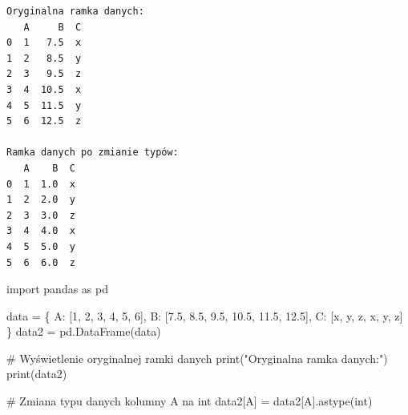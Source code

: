 \documentclass[
  polish,
  letterpaper,
  DIV=11,
  numbers=noendperiod]{scrreprt}
\newenvironment{Shaded}{\begin{snugshade}}{\end{snugshade}}
\newcommand{\BuiltInTok}[1]{\textcolor[rgb]{0.00,0.23,0.31}{#1}}
\newcommand{\CommentTok}[1]{\textcolor[rgb]{0.37,0.37,0.37}{#1}}
\newcommand{\ImportTok}[1]{\textcolor[rgb]{0.00,0.46,0.62}{#1}}
\newcommand{\NormalTok}[1]{\textcolor[rgb]{0.00,0.23,0.31}{#1}}
\newcommand{\OperatorTok}[1]{\textcolor[rgb]{0.37,0.37,0.37}{#1}}
\newcommand{\StringTok}[1]{\textcolor[rgb]{0.13,0.47,0.30}{#1}}
\begin{document}
\begin{verbatim}
Oryginalna ramka danych:
   A     B  C
0  1   7.5  x
1  2   8.5  y
2  3   9.5  z
3  4  10.5  x
4  5  11.5  y
5  6  12.5  z

Ramka danych po zmianie typów:
   A    B  C
0  1  1.0  x
1  2  2.0  y
2  3  3.0  z
3  4  4.0  x
4  5  5.0  y
5  6  6.0  z
\end{verbatim}

\begin{Shaded}
\begin{Highlighting}[]
\ImportTok{import}\NormalTok{ pandas }\ImportTok{as}\NormalTok{ pd}


\NormalTok{data }\OperatorTok{=}\NormalTok{ \{}
    \StringTok{\textquotesingle{}A\textquotesingle{}}\NormalTok{: [}\StringTok{\textquotesingle{}1\textquotesingle{}}\NormalTok{, }\StringTok{\textquotesingle{}2\textquotesingle{}}\NormalTok{, }\StringTok{\textquotesingle{}3\textquotesingle{}}\NormalTok{, }\StringTok{\textquotesingle{}4\textquotesingle{}}\NormalTok{, }\StringTok{\textquotesingle{}5\textquotesingle{}}\NormalTok{, }\StringTok{\textquotesingle{}6\textquotesingle{}}\NormalTok{],}
    \StringTok{\textquotesingle{}B\textquotesingle{}}\NormalTok{: [}\StringTok{\textquotesingle{}7.5\textquotesingle{}}\NormalTok{, }\StringTok{\textquotesingle{}8.5\textquotesingle{}}\NormalTok{, }\StringTok{\textquotesingle{}9.5\textquotesingle{}}\NormalTok{, }\StringTok{\textquotesingle{}10.5\textquotesingle{}}\NormalTok{, }\StringTok{\textquotesingle{}11.5\textquotesingle{}}\NormalTok{, }\StringTok{\textquotesingle{}12.5\textquotesingle{}}\NormalTok{],}
    \StringTok{\textquotesingle{}C\textquotesingle{}}\NormalTok{: [}\StringTok{\textquotesingle{}x\textquotesingle{}}\NormalTok{, }\StringTok{\textquotesingle{}y\textquotesingle{}}\NormalTok{, }\StringTok{\textquotesingle{}z\textquotesingle{}}\NormalTok{, }\StringTok{\textquotesingle{}x\textquotesingle{}}\NormalTok{, }\StringTok{\textquotesingle{}y\textquotesingle{}}\NormalTok{, }\StringTok{\textquotesingle{}z\textquotesingle{}}\NormalTok{]}
\NormalTok{\}}
\NormalTok{data2 }\OperatorTok{=}\NormalTok{ pd.DataFrame(data)}

\CommentTok{\# Wyświetlenie oryginalnej ramki danych}
\BuiltInTok{print}\NormalTok{(}\StringTok{"Oryginalna ramka danych:"}\NormalTok{)}
\BuiltInTok{print}\NormalTok{(data2)}

\CommentTok{\# Zmiana typu danych kolumny \textquotesingle{}A\textquotesingle{} na int}
\NormalTok{data2[}\StringTok{\textquotesingle{}A\textquotesingle{}}\NormalTok{] }\OperatorTok{=}\NormalTok{ data2[}\StringTok{\textquotesingle{}A\textquotesingle{}}\NormalTok{].astype(}\BuiltInTok{int}\NormalTok{)}


\end{Highlighting}
\end{Shaded}
\end{document}
